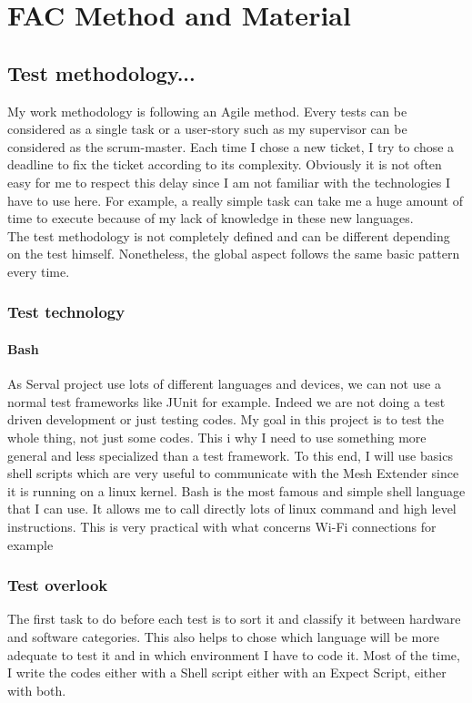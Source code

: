 \chapter{FAC  Method and Material}



\section{Test methodology...}
My work methodology is following an Agile method. Every tests can be considered as a single task or a user-story such as my supervisor can be considered as the scrum-master. Each time I chose a new ticket, I try to chose a deadline to fix the ticket according to its complexity. Obviously it is not often easy for me to respect this delay since I am not familiar with the technologies I have to use here. For example, a really simple task can take me a huge amount of time to execute because of my lack of knowledge in these new languages. \\   
The test methodology is not completely defined and can be different depending on the test himself. Nonetheless, the global aspect follows the same basic pattern every time.

\subsection{Test technology}
\subsubsection{Bash}
As Serval project use lots of different languages and devices, we can not use a normal test frameworks like JUnit for example. Indeed we are not doing a test driven development or just testing codes. My goal in this project is to test the whole thing, not just some codes. This i why I need to use something more general and less specialized than a test framework. To this end, I will use basics shell scripts which are very useful to communicate with the Mesh Extender since it is running on a linux kernel. Bash is the most famous and simple shell language that I can use. It allows me to call directly lots of linux command and high level instructions. This is very practical with what concerns Wi-Fi connections for example 


\subsection{Test overlook}
The first task to do before each test is to sort it and classify it between hardware and software categories. This also helps to chose which language will be more adequate to test it and in which environment I have to code it. Most of the time, I write the codes either with a Shell script either with an Expect Script, either with both.  


